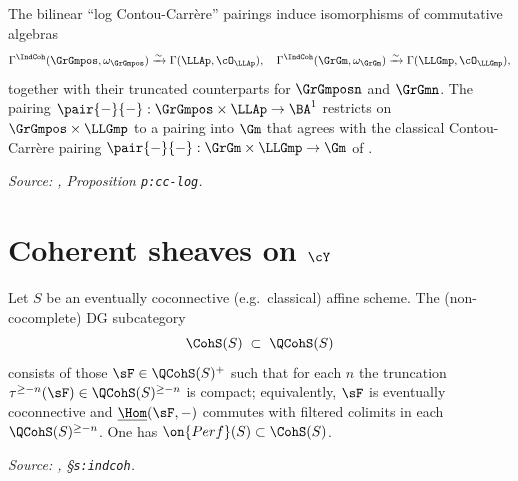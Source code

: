 \begin{proposition}
  \label{prop:cc-log}
  The bilinear ``log Contou-Carr\`ere'' pairings induce isomorphisms of
  commutative algebras
  \[
    \Gamma^{\IndCoh}(\GrGmpos, \omega_{\GrGmpos}) \xrightarrow{\sim}
    \Gamma(\LLAp, \cO_{\LLAp}),
    \quad
    \Gamma^{\IndCoh}(\GrGm, \omega_{\GrGm}) \xrightarrow{\sim}
    \Gamma(\LLGmp, \cO_{\LLGmp}),
  \]
  together with their truncated counterparts for $\GrGmposn$ and $\GrGmn$.
  The pairing $\pair{-}{-}:\GrGmpos \times \LLAp \to \BA^1$ restricts on
  $\GrGmpos \times \LLGmp$ to a pairing into $\Gm$ that agrees with the
  classical Contou-Carr\`ere pairing $\pair{-}{-}:\GrGm \times \LLGmp \to \Gm$
  of \cite{cc}.

  \textit{Source: \cite{hilburn-raskin}, Proposition \texttt{p:cc-log}.}
\end{proposition}

\section{Coherent sheaves on $\cY$}
\label{sec:indcoh}

\begin{definition}
  \label{def:coh-S}
  \uses{}
  Let $S$ be an eventually coconnective (e.g.\ classical) affine scheme.
  The (non-cocomplete) DG subcategory
  \[
    \CohS(S) \;\subset\; \QCohS(S)
  \]
  consists of those $\sF \in \QCohS(S)^+$ such that for each $n$ the
  truncation $\tau^{\geq -n}(\sF) \in \QCohS(S)^{\geq -n}$ is compact;
  equivalently, $\sF$ is eventually coconnective and
  $\underline{\Hom}(\sF,-)$ commutes with filtered colimits in each
  $\QCohS(S)^{\geq -n}$. One has $\on{Perf}(S) \subset \CohS(S)$.

  \textit{Source: \cite{hilburn-raskin}, \S\texttt{s:indcoh}.}
\end{definition}

